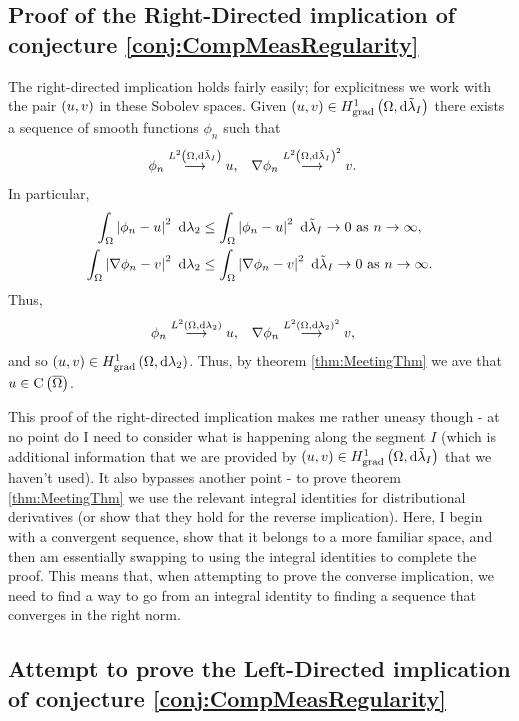 \documentclass[11pt]{report}
\theoremstyle{plain}
\newcommand{\tlambda}{\tilde{\lambda}}
\begin{document}
\subsection*{Proof of the Right-Directed implication of conjecture \ref{conj:CompMeasRegularity}}
The right-directed implication holds fairly easily; for explicitness we work with the pair $\left( u,v \right)$ in these Sobolev spaces.
Given $\bracs{u,v}\in\gradSob{\ddom}{\tlambda_I}$ there exists a sequence of smooth functions $\phi_n$ such that
\begin{align*}
	\phi_n \lconv{\ltwo{\ddom}{\tlambda_I}} u, &\quad \grad\phi_n \lconv{\ltwo{\ddom}{\tlambda_I}^2} v.
\end{align*}
In particular,
\begin{align*}
	\integral{\ddom}{\abs{\phi_n - u}^2}{\lambda_2} &\leq \integral{\ddom}{\abs{\phi_n - u}^2}{\tlambda_I} \rightarrow 0 \toInfty{n}, \\
	\integral{\ddom}{\abs{\grad\phi_n - v}^2}{\lambda_2} &\leq \integral{\ddom}{\abs{\grad\phi_n - v}^2}{\tlambda_I} \rightarrow 0 \toInfty{n}.
\end{align*}
Thus,
\begin{align*}
	\phi_n \overset{L^{2}\left( \Omega,\mathrm{d}\lambda_2 \right)}{\longrightarrow} u, &\quad \nabla\phi_n \overset{L^{2}\left( \Omega,\mathrm{d}\lambda_2 \right)^2}{\longrightarrow} v,
\end{align*}
and so $\left( u,v \right)\in H^1_\mathrm{grad}\left( \Omega, \mathrm{d}\lambda_2 \right)$.
Thus, by theorem \ref{thm:MeetingThm} we ave that $u\in\mathrm{C}\left( \overline{\Omega} \right)$. \newline

This proof of the right-directed implication makes me rather uneasy though - at no point do I need to consider what is happening along the segment $I$ (which is additional information that we are provided by $\bracs{u,v}\in\gradSob{\ddom}{\tlambda_I}$ that we haven't used).
It also bypasses another point - to prove theorem \ref{thm:MeetingThm} we use the relevant integral identities for distributional derivatives (or show that they hold for the reverse implication).
Here, I begin with a convergent sequence, show that it belongs to a more familiar space, and then am essentially swapping to using the integral identities to complete the proof.
This means that, when attempting to prove the converse implication, we need to find a way to go from an integral identity to finding a sequence that converges in the right norm.

\subsection*{Attempt to prove the Left-Directed implication of conjecture \ref{conj:CompMeasRegularity}}
\end{document}
